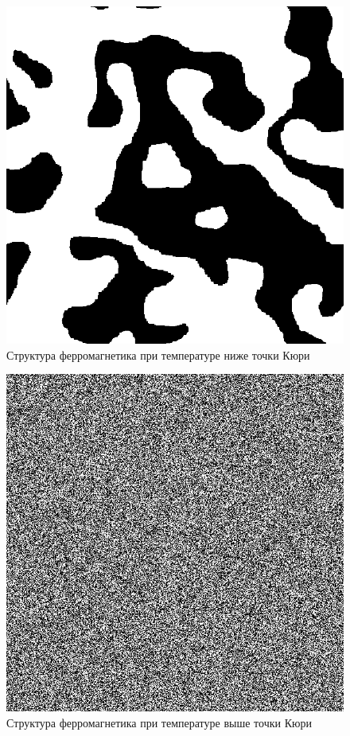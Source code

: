 \documentclass[12pt]{report}
\theoremstyle{definition}
\begin{document}
\begin{figure}[hbtp]
    \centering
    \includegraphics[scale=0.3]{img/low_t.png}
    \caption{Структура ферромагнетика при температуре ниже точки Кюри}
\end{figure}
\begin{figure}[hbtp]
    \centering
    \includegraphics[scale=0.3]{img/high_t.png}
    \caption{Структура ферромагнетика при температуре выше точки Кюри}
\end{figure}
\end{document}
